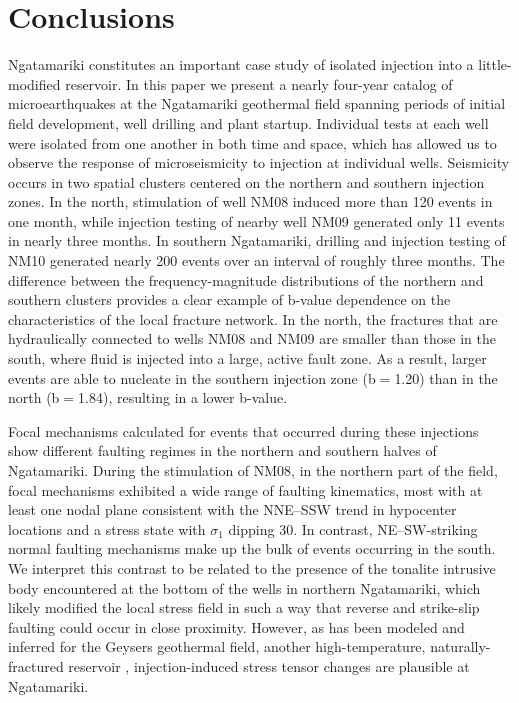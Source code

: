 \section{Conclusions}
Ngatamariki constitutes an important case study of isolated injection into a little-modified reservoir. In this paper we present a nearly four-year catalog of microearthquakes at the Ngatamariki geothermal field spanning periods of initial field development, well drilling and plant startup. Individual tests at each well were isolated from one another in both time and space, which has allowed us to observe the response of microseismicity to injection at individual wells. Seismicity occurs in two spatial clusters centered on the northern and southern injection zones. In the north, \gls{stimulation} of well NM08 induced more than 120 events in one month, while injection testing of nearby well NM09 generated only 11 events in nearly three months. In southern Ngatamariki, drilling and injection testing of NM10 generated nearly 200 events over an interval of roughly three months. The difference between the frequency-magnitude distributions of the northern and southern clusters provides a clear example of b-value dependence on the characteristics of the local fracture network. In the north, the fractures that are hydraulically connected to wells NM08 and NM09 are smaller than those in the south, where fluid is injected into a large, active fault zone. As a result, larger events are able to nucleate in the southern injection zone (b$=$1.20) than in the north (b$=$1.84), resulting in a lower b-value.

Focal mechanisms calculated for events that occurred during these injections show different faulting regimes in the northern and southern halves of Ngatamariki. During the \gls{stimulation} of NM08, in the northern part of the field, focal mechanisms exhibited a wide range of faulting kinematics, most with at least one nodal plane consistent with the NNE--SSW trend in hypocenter locations and a stress state with $\sigma_{1}$ dipping 30\textdegree. In contrast, NE--SW-striking normal faulting mechanisms make up the bulk of events occurring in the south. We interpret this contrast to be related to the presence of the tonalite intrusive body encountered at the bottom of the wells in northern Ngatamariki, which likely modified the local stress field in such a way that reverse and strike-slip faulting could occur in close proximity. However, as has been modeled and inferred for the Geysers geothermal field, another high-temperature, naturally-fractured reservoir \citep{Mart_nez_Garz_n_2014,Jeanne_2015tensor}, injection-induced stress tensor changes are plausible at Ngatamariki.

